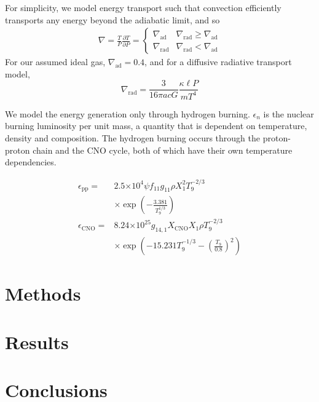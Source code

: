\documentclass[onecolumn]{article}
\newcommand{\E}[1]{\ensuremath{\times 10^{#1}}}
\newcommand{\D}[2]{\ensuremath{\frac{\partial #1}{\partial #2}}}
\begin{document}
For simplicity, we model energy transport such that convection efficiently transports any energy beyond the adiabatic limit, and so
\begin{align} \nabla = \frac{T}{P}\D{T}{P} = 
  \begin{cases}
    \nabla_\text{ad} & \nabla_\text{rad} \ge \nabla_\text{ad} \\
    \nabla_\text{rad} & \nabla_\text{rad} < \nabla_\text{ad}
  \end{cases}
\end{align}
For our assumed ideal gas, $\nabla_\text{ad} = 0.4$, and for a diffusive radiative transport model,
\begin{equation} 
  \nabla_\text{rad} = \frac{3}{16\pi a c G}\frac{\kappa \ell P}{m T^4} 
\end{equation}

We model the energy generation only through hydrogen burning.  $\epsilon_n$  is the nuclear burning luminosity per unit mass, a quantity that is dependent on temperature, density and composition.  The hydrogen burning occurs through the proton-proton chain and the CNO cycle, both of which have their own temperature dependencies.

\begin{align}  
  \epsilon_\text{pp} =& 2.5\E{4} \psi f_{11} g_\text{11} \rho X_1^2 T_9^{-2/3} \\
                      & \times \exp\left(-\frac{3.381}{T_9^{1/3}}\right) \nonumber \\
  \epsilon_\text{CNO} =& 8.24\E{25} g_{14,1} X_\text{CNO} X_1 \rho T_9^{-2/3} \nonumber \\
                      & \times \exp\left(-15.231 T_9^{-1/3} - \left(\frac{T_9}{0.8}\right)^2\right) \nonumber
\end{align}


\section{Methods}

\section{Results}

\section{Conclusions}
\end{document}
